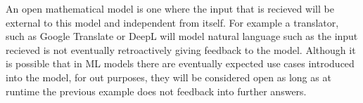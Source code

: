 \documentclass{textbook}
\begin{document}
An open mathematical model is one where the input that is recieved will be external to this model and
independent from itself. For example a translator, such as Google Translate or DeepL will model natural language
such as the input recieved is not eventually retroactively giving feedback to the model. Although it is possible that
in ML models there are eventually expected use cases introduced into the model, for out purposes, they will be considered 
open as long as at runtime the previous example does not feedback into further answers.





\section{}
\end{document}
